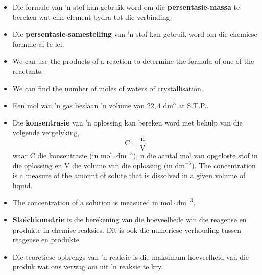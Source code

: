 \begin{itemize}[noitemsep]
\item Die formule van  'n stof kan gebruik word om die \textbf{persentasie-massa} te bereken wat elke element bydra tot die verbinding.
\item Die \textbf{persentasie-samestelling} van  'n stof kan gebruik word om die chemiese formule af te lei.
\item We can use the products of a reaction to determine the formula of one of the reactants. 
\item We can find the number of moles of waters of crystallisation.
\item Een mol van  'n gas beslaan  'n volume van $22,4 {\text{ dm}}^{3}$ at S.T.P..
\item Die \textbf{konsentrasie} van  'n oplossing kan bereken word met behulp van die volgende vergelyking,
\label{m38712*id286019}\nopagebreak\noindent{}
    \begin{equation*}
    \text{C}=\frac{\text{n}}{\text{V}}
      \end{equation*}
waar C die konsentrasie (in $\text{mol} \cdot {\text{dm}}^{-3}$), n die aantal mol van opgeloste stof in die oplossing en V die volume van die oplossing (in ${\text{dm}}^{-3}$). The concentration is a measure of the amount of solute that is dissolved in a given volume of liquid.
\item The concentration of a solution is measured in $\text{mol} \cdot {\text{dm}}^{-3}$.
\item \textbf{Stoichiometrie} is die berekening van die hoeveelhede van die reagense en produkte in  chemise reaksies. Dit is ook die numeriese verhouding tussen reagense en produkte.
\item Die teoretiese opbrengs van  'n reaksie is die maksimum hoeveelheid van die produk wat ons verwag om uit  'n reaksie te kry.\end{itemize}
\label{m38712*secfhsst!!!underscore!!!id2334}
